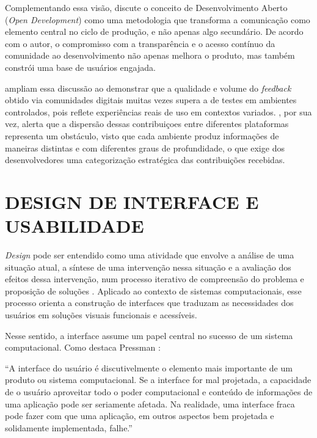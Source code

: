 Complementando essa visão,  discute o conceito de Desenvolvimento Aberto (\textit{Open Development}) como uma metodologia que transforma a comunicação como elemento central no ciclo de produção, e não apenas algo secundário. De acordo com o autor, o compromisso com a transparência e o acesso contínuo da comunidade ao desenvolvimento não apenas melhora o produto, mas também constrói uma base de usuários engajada.

 ampliam essa discussão ao demonstrar que a qualidade e volume do \textit{feedback} obtido via comunidades digitais muitas vezes supera a de testes em ambientes controlados, pois reflete experiências reais de uso em contextos variados. , por sua vez, alerta que a dispersão dessas contribuiçoes entre diferentes plataformas representa um obstáculo, visto que cada ambiente produz informações de maneiras distintas e com diferentes graus de profundidade, o que exige dos desenvolvedores uma categorização estratégica das contribuições recebidas.


\section{DESIGN DE INTERFACE E USABILIDADE}

\textit{Design} pode ser entendido como uma atividade que envolve a análise de uma situação atual, a síntese de uma intervenção nessa situação e a avaliação dos efeitos dessa intervenção, num processo iterativo de compreensão do problema e proposição de soluções \cite{barbosa2010}. Aplicado ao contexto de sistemas computacionais, esse processo orienta a construção de interfaces que traduzam as necessidades dos usuários em soluções visuais funcionais e acessíveis.

Nesse sentido, a interface assume um papel central no sucesso de um sistema computacional. Como destaca Pressman :

\begin{citacao}
    “A interface do usuário é discutivelmente o elemento mais importante de um produto ou sistema computacional. Se a interface for mal projetada, a capacidade de o usuário aproveitar todo o poder computacional e conteúdo de informações de uma aplicação pode ser seriamente afetada. Na realidade, uma interface fraca pode fazer com que uma aplicação, em outros aspectos bem projetada e solidamente implementada, falhe.” \cite{pressman2011}
\end{citacao}


